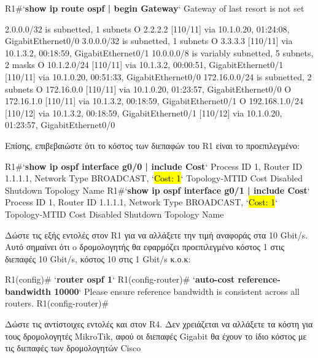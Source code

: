 \documentclass{EdipyLabs} %
\begin{document}
\begin{CommandBox}
R1#`\textbf{show ip route ospf | begin Gateway}`
Gateway of last resort is not set

      2.0.0.0/32 is subnetted, 1 subnets
O        2.2.2.2 [110/11] via 10.1.0.20, 01:24:08, GigabitEthernet0/0
      3.0.0.0/32 is subnetted, 1 subnets
O        3.3.3.3 [110/11] via 10.1.3.2, 00:18:59, GigabitEthernet0/1
      10.0.0.0/8 is variably subnetted, 5 subnets, 2 masks
O        10.1.2.0/24 [110/11] via 10.1.3.2, 00:00:51, GigabitEthernet0/1
                     [110/11] via 10.1.0.20, 00:51:33, GigabitEthernet0/0
      172.16.0.0/24 is subnetted, 2 subnets
O        172.16.0.0 [110/11] via 10.1.0.20, 01:23:57, GigabitEthernet0/0
O        172.16.1.0 [110/11] via 10.1.3.2, 00:18:59, GigabitEthernet0/1
O     192.168.1.0/24 [110/12] via 10.1.3.2, 00:18:59, GigabitEthernet0/1
                     [110/12] via 10.1.0.20, 01:23:57, GigabitEthernet0/0
\end{CommandBox}\vspace*{0.25cm}

Επίσης, επιβεβαιώστε ότι το κόστος των διεπαφών του R1 είναι το προεπιλεγμένο:

\begin{CommandBox}
R1#`\textbf{show ip ospf interface g0/0 | include Cost}`
  Process ID 1, Router ID 1.1.1.1, Network Type BROADCAST, `\hl{Cost: 1}`
  Topology-MTID    Cost    Disabled    Shutdown      Topology Name
R1#`\textbf{show ip ospf interface g0/1 | include Cost}`
  Process ID 1, Router ID 1.1.1.1, Network Type BROADCAST, `\hl{Cost: 1}`
  Topology-MTID    Cost    Disabled    Shutdown      Topology Name
\end{CommandBox}

Δώστε τις εξής εντολές στον R1 για να αλλάξετε την τιμή αναφοράς στα 10 Gbit/s. Αυτό σημαίνει ότι o δρομολογητής θα εφαρμόζει προεπιλεγμένο κόστος 1 στις διεπαφές 10 Gbit/s, κόστος 10 στις 1 Gbit/s κ.ο.κ:

\begin{CommandBox}
R1(config)# `\textbf{router ospf 1}`
R1(config-router)# `\textbf{auto-cost reference-bandwidth 10000}`
        Please ensure reference bandwidth is consistent across all routers.
R1(config-router)#
\end{CommandBox}

Δώστε τις αντίστοιχες εντολές και στον R4. Δεν χρειάζεται να αλλάξετε τα κόστη για τους δρομολογητές MikroTik, αφού οι διεπαφές Gigabit θα έχουν το ίδιο κόστος με τις διεπαφές των δρομολογητών Cisco
\end{document}
